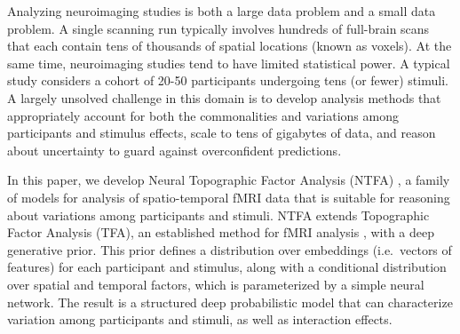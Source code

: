 \documentclass[twoside]{article}
\begin{document}
Analyzing neuroimaging studies is both a large data problem and a small data problem.  A single scanning run typically involves hundreds of full-brain scans that each contain tens of thousands of spatial locations (known as voxels). At the same time, neuroimaging studies tend to have limited statistical power. A typical study considers a cohort of 20-50 participants undergoing tens (or fewer) stimuli.  A largely unsolved challenge in this domain is to develop analysis methods that appropriately account for both the commonalities and variations among participants and stimulus effects, scale to tens of gigabytes of data, and reason about uncertainty to guard against overconfident predictions.

In this paper, we develop Neural Topographic Factor Analysis (NTFA)%
, a family of models for analysis of spatio-temporal fMRI data that is suitable for reasoning about variations among participants and stimuli. NTFA extends Topographic Factor Analysis (TFA), an established method for fMRI analysis \citep{manning2014topographic}, with a deep generative prior. This prior defines a distribution over embeddings (i.e.~vectors of features) for each participant and stimulus, along with a conditional distribution over spatial and temporal factors, which is parameterized by a simple neural network. The result is a structured deep probabilistic model that can characterize variation among participants and stimuli, as well as interaction effects.
\end{document}
